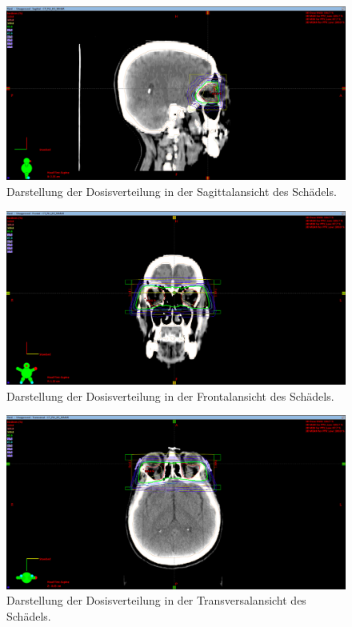 \begin{figure}[htpb]
	\centering
	\includegraphics[width=0.7\linewidth]{../Bilder/EO_X_mitPTV}
	\caption{Darstellung der Dosisverteilung in der Sagittalansicht des Schädels.}
	\label{fig:eoxmitptv}
\end{figure}

\begin{figure}[htpb]
	\centering
	\includegraphics[width=0.7\linewidth]{../Bilder/EO_Y_mitPTV}
	\caption{Darstellung der Dosisverteilung in der Frontalansicht des Schädels.}
	\label{fig:eoymitptv}
\end{figure}

\begin{figure}[htpb]
	\centering
	\includegraphics[width=0.7\linewidth]{../Bilder/EO_Z}
	\caption{Darstellung der Dosisverteilung in der Transversalansicht des Schädels.}
	\label{fig:eoz}
\end{figure}

